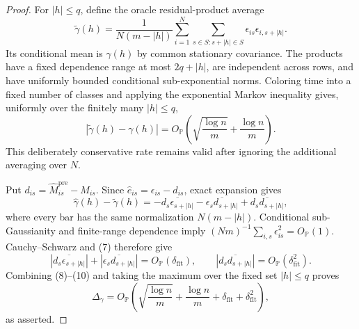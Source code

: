 \documentclass{article}
\begin{document}
\begin{proof}
For \(|h|\le q\), define the oracle residual-product average
\[
 \widetilde\gamma(h)=\frac{1}{N(m-|h|)}
 \sum_{i=1}^N\sum_{s\in S:s+|h|\in S}
 \epsilon_{is}\epsilon_{i,s+|h|}.
\]
Its conditional mean is \(\gamma(h)\) by common stationary covariance.  The products have a fixed dependence range at most \(2q+|h|\), are independent across rows, and have uniformly bounded conditional sub-exponential norms.  Coloring time into a fixed number of classes and applying the exponential Markov inequality gives, uniformly over the finitely many \(|h|\le q\),
\[
 |\widetilde\gamma(h)-\gamma(h)|
 =O_{\mathbb P}\!\left(
 \sqrt{\frac{\log n}{m}}+\frac{\log n}{m}\right).
 \tag{8}
\]
This deliberately conservative rate remains valid after ignoring the additional averaging over \(N\).

Put \(d_{is}=\widehat M^{\mathrm{pre}}_{is}-M_{is}\).  Since \(\widehat e_{is}=\epsilon_{is}-d_{is}\), exact expansion gives
\[
 \widehat\gamma(h)-\widetilde\gamma(h)
 =-\overline{d_s\epsilon_{s+|h|}}
  -\overline{\epsilon_sd_{s+|h|}}
  +\overline{d_sd_{s+|h|}},
 \tag{9}
\]
where every bar has the same normalization \(N(m-|h|)\).  Conditional sub-Gaussianity and finite-range dependence imply \((Nm)^{-1}\sum_{i,s}\epsilon_{is}^2=O_{\mathbb P}(1)\).  Cauchy--Schwarz and (7) therefore give
\[
 |\overline{d_s\epsilon_{s+|h|}}|
 +|\overline{\epsilon_sd_{s+|h|}}|
 =O_{\mathbb P}(\delta_{\mathrm{fit}}),
 \qquad
 |\overline{d_sd_{s+|h|}}|
 =O_{\mathbb P}(\delta_{\mathrm{fit}}^2).
 \tag{10}
\]
Combining (8)--(10) and taking the maximum over the fixed set \(|h|\le q\) proves
\[
 \Delta_\gamma=O_{\mathbb P}\!\left(
 \sqrt{\frac{\log n}{m}}+\frac{\log n}{m}
 +\delta_{\mathrm{fit}}+\delta_{\mathrm{fit}}^2\right),
\]
as asserted.
\end{proof}
\end{document}

